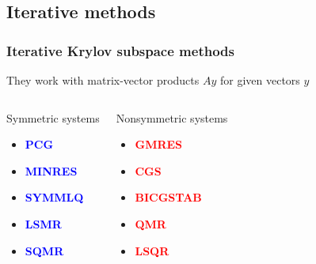 \documentclass[handout]{beamer}
{
\usepackage{fullpage}
\usepackage{hyperref}
\usepackage{amssymb} 
}
\newcommand{\red}[1]{\textcolor{red}{#1}}
\newcommand{\blue}[1]{\textcolor{blue}{#1}}
\begin{document}
\subsection{Iterative methods}

\begin{frame}
\frametitle{Iterative Krylov subspace methods}

They work with matrix-vector products $Ay$ for given vectors $y$
\begin{columns}[t]
\begin{block}{Symmetric systems}
\begin{itemize}
\item \blue{\bf{PCG}}
\item \blue{\bf{MINRES}}
\item \blue{\bf{SYMMLQ}}
\item \blue{\bf{LSMR}}
\item \blue{\bf{SQMR}}
\end{itemize}
\end{block}

\begin{block}{Nonsymmetric systems}
\begin{itemize}
\item \red{\bf{GMRES}}
\item \red{\bf{CGS}}
\item \red{\bf{BICGSTAB}}
\item \red{\bf{QMR}}
\item \red{\bf{LSQR}}
\end{itemize}
\end{block}
\end{columns}


\end{frame}
\end{document}
